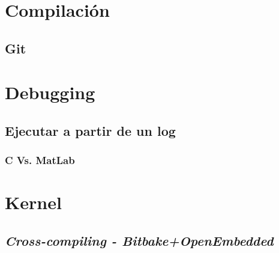 \documentclass[main]{subfiles}
\begin{document}
\section{Compilación}
\label{sec:codigo:compilacion}


\subsection{Git}
\label{sec:codigo:git}


\section{Debugging}
\label{sec:codigo:debugging}


\subsection{Ejecutar a partir de un log}
\label{sec:codigo:ejecutar-a-partir-de-un-log}


\subsubsection{C Vs. MatLab}
\label{sec:codigo:c-vs-matlab}


\section{Kernel}
\label{sec:codigo:kernel}


\subsection{\textit{Cross-compiling - Bitbake+OpenEmbedded}}
\label{sec:codigo:cross-compiling-bitbake-oe}

\end{document}
